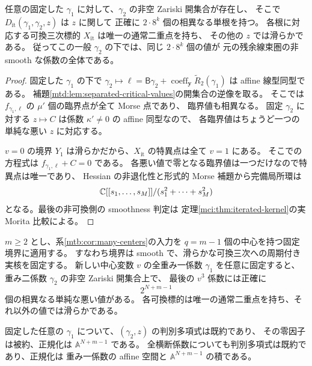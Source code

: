 \begin{corollary}
\label{mtd:cor:simple-values}
任意の固定した $\gamma_1$ に対して、$\gamma_2$ の非空 Zariski 開集合が存在し、
そこで $D_{\mathrm{it}}(\gamma_1,\gamma_2,z)$ は $z$ に関して
正確に $2\cdot8^k$ 個の相異なる単根を持つ。
各根に対応する可換三次標的 $X_{\mathrm{it}}$ は唯一の通常二重点を持ち、
その他の $z$ では滑らかである。
従ってこの一般 $\gamma_2$ の下では、同じ $2\cdot8^k$ 個の値が
元の残余線束圏の非 smooth な係数の全体である。
\end{corollary}

\begin{proof}
固定した $\gamma_1$ の下で
$\gamma_2\mapsto\ell=\mathsf B\gamma_2+
\operatorname{coeff}_{\mathbf y}\widetilde R_2(\gamma_1)$ は affine 線型同型である。
補題\ref{mtd:lem:separated-critical-values}の開集合の逆像を取る。
そこでは $f_{\gamma_1,\ell}$ の $\mu'$ 個の臨界点が全て Morse 点であり、
臨界値も相異なる。
固定 $\gamma_2$ に対する $z\mapsto C$ は係数 $\kappa'\ne0$ の affine 同型なので、
各臨界値はちょうど一つの単純な悪い $z$ に対応する。

$v=0$ の境界 $Y_1$ は滑らかだから、$X_{\mathrm{it}}$ の特異点は全て $v=1$ にある。
そこでの方程式は $f_{\gamma_1,\ell}+C=0$ である。
各悪い値で零となる臨界値は一つだけなので特異点は唯一であり、
Hessian の非退化性と形式的 Morse 補題から完備局所環は
\[
             \mathbb C[[s_1,\ldots,s_M]]/(s_1^2+\cdots+s_M^2)
\]
となる。最後の非可換側の smoothness 判定は
定理\ref{mci:thm:iterated-kernel}の実 Morita 比較による。
\end{proof}

\begin{corollary}[一般の中央段での最後の判別次数]
\label{mtd:cor:many-centers}
$m\ge2$ とし、系\ref{mtb:cor:many-centers}の入力を
$q=m-1$ 個の中心を持つ固定境界に適用する。
すなわち境界は smooth で、滑らかな可換三次への周期付き実核を固定する。
新しい中心変数 $v$ の全重み一係数 $\gamma_1$ を任意に固定すると、
重み二係数 $\gamma_2$ の非空 Zariski 開集合上で、
最後の $v^3$ 係数には正確に
\[
                              2^{N+m-1}
\]
個の相異なる単純な悪い値がある。
各可換標的は唯一の通常二重点を持ち、それ以外の値では滑らかである。

固定した任意の $\gamma_1$ について、$(\gamma_2,z)$ の判別多項式は既約であり、
その零因子は被約、正規化は $\mathbb A^{N+m-1}$ である。
全横断係数についても判別多項式は既約であり、正規化は
重み一係数の affine 空間と $\mathbb A^{N+m-1}$ の積である。
\end{corollary}

